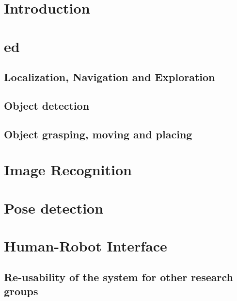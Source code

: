\documentclass[runningheads,a4paper]{llncs}
\begin{document}
\section{Introduction}


\section{\acrfull{ed}}


\subsection{Localization, Navigation and Exploration}


\subsection{Object detection}


\subsection{Object grasping, moving and placing}


\section{Image Recognition}


\section{Pose detection}


%

%

\section{Human-Robot Interface}



\subsection{Re-usability of the system for other research groups}

\end{document}

